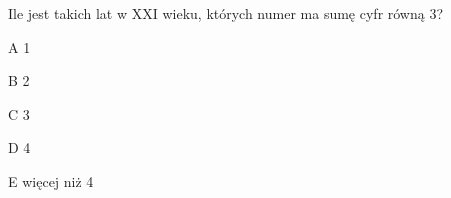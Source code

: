 \begin{tresc}
Ile jest takich lat w XXI wieku, których numer ma sumę cyfr równą 3?
\end{tresc}
\begin{wariant}{A} 1 \end{wariant}
\begin{wariant}{B} 2 \end{wariant}
\begin{wariant}{C} 3 \end{wariant}
\begin{wariant}{D} 4 \end{wariant}
\begin{wariant}{E} więcej niż 4 \end{wariant}
